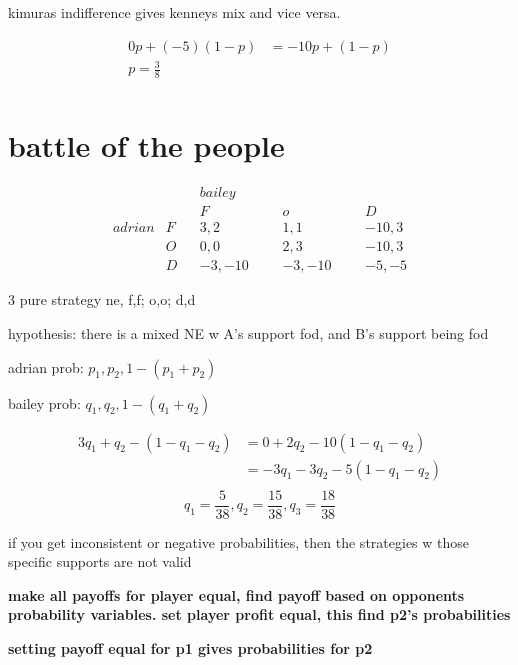 \documentclass{article}
\theoremstyle{definition}
\begin{document}
kimuras indifference gives kenneys mix and vice versa. 


\begin{equation}
    \begin{split}
        0p + (-5)(1-p)&= -10p + (1-p)\\
        p=\frac{3}{8}\\
    \end{split}
\end{equation}



\section{battle of the people}

\begin{equation}
    \begin{matrix}
        ~&~&&bailey~&&&~&&&~\\
        ~&~&&F&&&o&&&D\\
        adrian&F&&3,2&&&1,1&&&-10,3\\
        ~&O&&0,0&&&2,3&&&-10,3\\
        ~&D&&-3,-10&&&-3,-10&&&-5,-5
    \end{matrix}
\end{equation}

3 pure strategy ne, f,f; o,o; d,d

hypothesis: there is a mixed NE w A's support fod, and B's support being fod


adrian prob: \(p_1,p_2,1-(p_1+p_2)\)

bailey prob: \(q_1,q_2,1-(q_1+q_2)\)

\begin{equation}\begin{split}
    3q_1+q_2-(1-q_1-q_2)&= 0+2q_2-10(1-q_1-q_2)\\
    &= -3q_1-3q_2-5(1-q_1-q_2)\\
\end{split}
\end{equation}
\begin{equation}
        q_1=\frac{5}{38}, q_2=\frac{15}{38}, q_3 = \frac{18}{38}
\end{equation}


if you get inconsistent or negative probabilities, then the strategies w those specific supports are not valid




\textbf{make all payoffs for player equal, find payoff based on opponents probability variables. set player profit equal, this find p2's probabilities}

\textbf{setting payoff equal for p1 gives probabilities for p2}
\end{document}

